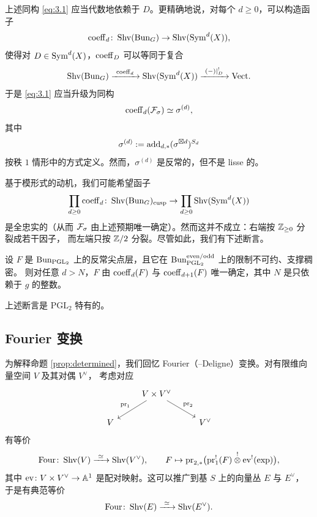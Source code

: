 上述同构 \eqref{eq:3.1} 应当代数地依赖于 \(D\)。更精确地说，对每个 \(d\ge 0\)，可以构造函子
\[
\operatorname{coeff}_d\colon\operatorname{Shv}(\operatorname{Bun}_G)\to\operatorname{Shv}(\operatorname{Sym}^d(X)),
\]
使得对 \(D\in\operatorname{Sym}^d(X)\)，\(\operatorname{coeff}_D\) 可以等同于复合
\[
\Shv(\Bun_G)\xrightarrow{\ \coeff_d\ }\Shv(\Sym^d(X))\xrightarrow{\ (-)|^!_D\ }\Vect.
\]
于是 \eqref{eq:3.1} 应当升级为同构
\[
\operatorname{coeff}_d(\mathcal{F}_\sigma)\simeq\sigma^{(d)},
\]
其中
\[
\sigma^{(d)}:=\operatorname{add}_{d,*}(\sigma^{\boxtimes d})^{S_d}
\]
按秩 \(1\) 情形中的方式定义。然而，\(\sigma^{(d)}\) 是反常的，但不是 lisse 的。

基于模形式的动机，我们可能希望函子
\[
\prod_{d\ge 0}\operatorname{coeff}_d\colon\operatorname{Shv}(\operatorname{Bun}_G)_{\mathrm{cusp}}\to\prod_{d\ge 0}\operatorname{Shv}(\operatorname{Sym}^d(X))
\]
是全忠实的（从而 \(\mathcal{F}_\sigma\) 由上述预期唯一确定）。然而这并不成立：右端按 \(\mathbb{Z}_{\ge 0}\) 分裂成若干因子，
而左端只按 \(\mathbb{Z}/2\) 分裂。尽管如此，我们有下述断言。

\begin{proposition}\label{prop:determined}
设 \(F\) 是 \(\operatorname{Bun}_{\mathrm{PGL}_2}\) 上的反常尖点层，且它在
\(\operatorname{Bun}^{\mathrm{even}/\mathrm{odd}}_{\mathrm{PGL}_2}\) 上的限制不可约、支撑稠密。
则对任意 \(d>N\)，\(F\) 由 \(\operatorname{coeff}_d(F)\) 与 \(\operatorname{coeff}_{d+1}(F)\) 唯一确定，其中 \(N\) 是只依赖于 \(g\) 的整数。
\end{proposition}

\begin{remark}[警告]\label{rem:only-pgl2}
上述断言是 \(\mathrm{PGL}_2\) 特有的。
\end{remark}

\subsection{Fourier 变换}

为解释命题 \ref{prop:determined}，我们回忆 Fourier（--Deligne）变换。对有限维向量空间 \(V\) 及其对偶 \(V^\vee\)，
考虑对应
\[
\begin{tikzcd}
& V\times V^\vee \arrow[dl,"\mathrm{pr}_1"'] \arrow[dr,"\mathrm{pr}_2"] & \\
V & & V^\vee
\end{tikzcd}
\]
有等价
\[
\Four\colon\Shv(V)\xrightarrow{\ \simeq\ }\Shv(V^\vee),\qquad
F\mapsto \mathrm{pr}_{2,*}\bigl(\mathrm{pr}_1^!(F)\overset{!}{\otimes}\mathrm{ev}^!(\exp)\bigr),
\]
其中 \(\mathrm{ev}\colon V\times V^\vee\to\mathbb{A}^1\) 是配对映射。这可以推广到基 \(S\) 上的向量丛 \(E\) 与 \(E^\vee\)，
于是有典范等价
\[
\Four\colon\Shv(E)\xrightarrow{\ \simeq\ }\Shv(E^\vee).
\]

